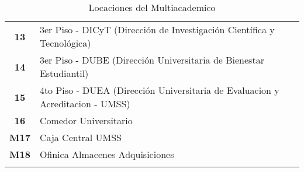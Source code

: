 \begin{longtable}{ c  X }
\textbf{13}
&
3{\tiny er} Piso - DICyT (Dirección de Investigación Científica y Tecnológica)
\\



\textbf{14}
&
3{\tiny er} Piso - DUBE (Dirección Universitaria de Bienestar Estudiantil)
\\


\textbf{15}
&
4{\tiny to} Piso - DUEA (Dirección Universitaria de Evaluacion y Acreditacion - UMSS)
\\

\textbf{16}
&
Comedor Universitario
\\


\textbf{M17}
&
Caja Central UMSS
\\


\textbf{M18}
&
Ofinica Almacenes Adquisiciones
\\

      \bottomrule
      \caption{Locaciones del Multiacademico}
      \label{tab:lugares_multiacademico}
    \end{longtable}
